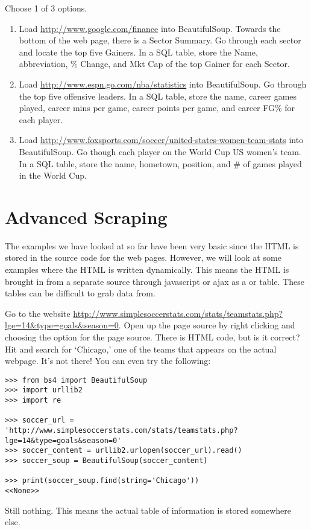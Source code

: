 \begin{problem}
Choose 1 of 3 options.
\begin{enumerate}
\item Load \url{http://www.google.com/finance} into BeautifulSoup.
Towards the bottom of the web page, there is a Sector Summary.
Go through each sector and locate the top five Gainers.
In a SQL table, store the Name, abbreviation, \% Change, and Mkt Cap of the top Gainer for each Sector.

\item Load \url{http://www.espn.go.com/nba/statistics} into BeautifulSoup.
Go through the top five offensive leaders.
In a SQL table, store the name, career games played, career mins per game, career points per game, and career FG\% for each player.

\item Load \url{http://www.foxsports.com/soccer/united-states-women-team-stats} into BeautifulSoup.
Go though each player on the World Cup US women's team.
In a SQL table, store the name, hometown, position, and \# of games played in the World Cup.
\end{enumerate}
\end{problem}

\section*{Advanced Scraping}
The examples we have looked at so far have been very basic since the HTML is stored in the source code for the web pages.
However, we will look at some examples where the HTML is written dynamically.
This means the HTML is brought in from a separate source through javascript or ajax as a  or  table.
These tables can be difficult to grab data from.

Go to the website \url{http://www.simplesoccerstats.com/stats/teamstats.php?lge=14&type=goals&season=0}.
Open up the page source by right clicking and choosing the option for the page source.
There is HTML code, but is it correct?
Hit  and search for `Chicago,' one of the teams that appears on the actual webpage.
It's not there!
You can even try the following:

\begin{lstlisting}
>>> from bs4 import BeautifulSoup
>>> import urllib2
>>> import re

>>> soccer_url = 'http://www.simplesoccerstats.com/stats/teamstats.php?lge=14&type=goals&season=0'
>>> soccer_content = urllib2.urlopen(soccer_url).read()
>>> soccer_soup = BeautifulSoup(soccer_content)

>>> print(soccer_soup.find(string='Chicago'))
<<None>>
\end{lstlisting}
Still nothing. This means the actual table of information is stored somewhere else.

